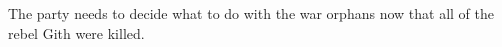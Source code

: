 The party needs to decide what to do with the war orphans now that all of the rebel Gith were killed.

